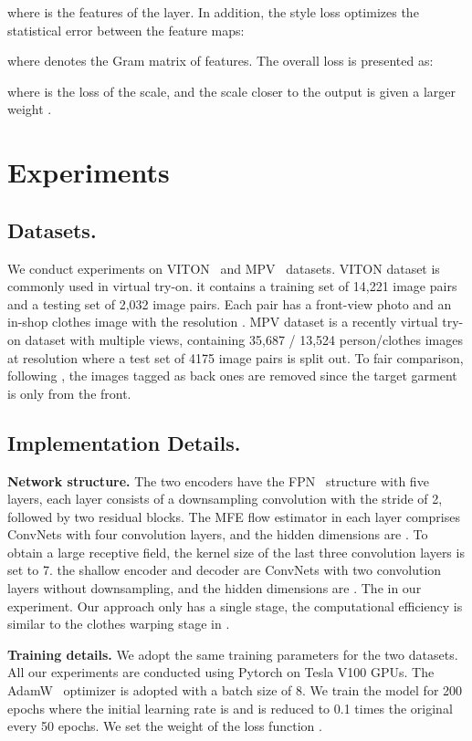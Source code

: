 \documentclass[runningheads]{llncs}
\begin{document}
where  is the features of the  layer. In addition, the style loss optimizes the statistical error between the feature maps:

where  denotes the Gram matrix of features. The overall loss is presented as:

where  is the loss of the  scale, and the scale closer to the output is given a larger weight .



\section{Experiments}


 \subsection{Datasets.} 
 We conduct experiments on VITON~\cite{han2018viton} and MPV~\cite{MPV} datasets. VITON dataset is commonly used in virtual try-on. it contains a training set of 14,221 image pairs and a testing set of 2,032 image pairs. Each pair has a front-view photo and an in-shop clothes image with the resolution . MPV dataset is a recently virtual try-on dataset with multiple views, containing 35,687 / 13,524 person/clothes images at  resolution where a test set of 4175 image pairs is split out. To fair comparison, following \cite{issenhuth2020not,ge2021parser}, the images tagged as back ones are removed since the target garment is only from the front. 

 
\subsection{Implementation Details.} 
\textbf{Network structure.} The two encoders have the FPN~\cite{fpn} structure with five layers, each layer consists of a downsampling convolution with the stride of 2, followed by two residual blocks. The MFE flow estimator in each layer comprises ConvNets with four convolution layers, and the hidden dimensions are . To obtain a large receptive field, the kernel size of the last three convolution layers is set to 7. the shallow encoder and decoder are ConvNets with two convolution layers without downsampling, and the hidden dimensions are . The  in our experiment. Our approach only has a single stage, the computational efficiency is similar to the clothes warping stage in \cite{han2019clothflow,ge2021parser}. 

\textbf{Training details.} We adopt the same training parameters for the two datasets. All our experiments are conducted using Pytorch on Tesla V100 GPUs. The AdamW~\cite{loshchilov2017decoupled} optimizer is adopted with a batch size of 8. We train the model for 200 epochs where the initial learning rate is  and is reduced to 0.1 times the original every 50 epochs. We set the weight of the loss function .
\end{document}
